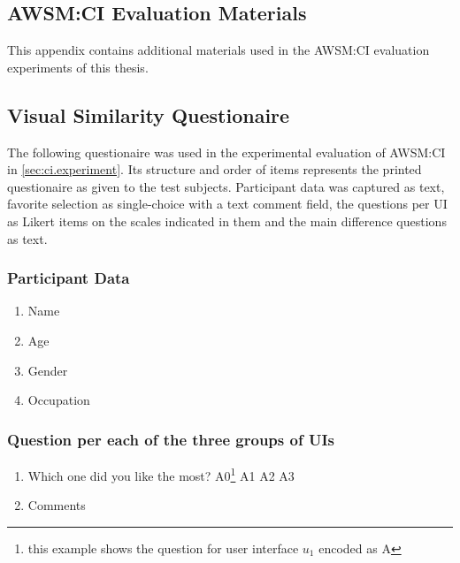 \begin{appendix}
\chapter{AWSM:CI Evaluation Materials}
This appendix contains additional materials used in the AWSM:CI evaluation experiments of this thesis.

\section{Visual Similarity Questionaire\label{sec:ci-questionaire}}
\vspace{15pt}

The following questionaire was used in the experimental evaluation of AWSM:CI in \cref{sec:ci.experiment}. Its structure and order of items represents the printed questionaire as given to the test subjects. Participant data was captured as text, favorite selection as single-choice with a text comment field, the questions per UI as Likert items on the scales indicated in them and the main difference questions as text.

\subsection*{Participant Data}
\begin{enumerate}
\item Name
\item Age
\item Gender
\item Occupation
\end{enumerate}

\pagebreak
\subsection*{Question per each of the three groups of UIs}
\begin{enumerate}
\item Which one did you like the most?
\subitem A0\footnote{this example shows the question for user interface \(u_1\) encoded as A}
\subitem A1
\subitem A2
\subitem A3
\item Comments
\end{enumerate}


\end{appendix}
